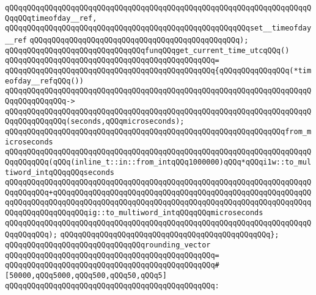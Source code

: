 \verb|qQQqqQQqqQQqqQQqqQQqqQQqqQQqqQQqqQQqqQQqqQQqqQQqqQQqqQQqqQQqqQQqqQQqqQQqqQQqtimeofday__ref,|\newline
\verb|qQQqqQQqqQQqqQQqqQQqqQQqqQQqqQQqqQQqqQQqqQQqqQQqqQQqqQQqset__timeofday__ref|\newline
\verb|qQQqqQQqqQQqqQQqqQQqqQQqqQQqqQQqqQQqqQQqqQQqqQQq);|\newline
\newline
\newline
\verb|qQQqqQQqqQQqqQQqqQQqqQQqqQQqqQQqfunqQQqget_current_time_utcqQQq()|\newline
\verb|qQQqqQQqqQQqqQQqqQQqqQQqqQQqqQQqqQQqqQQqqQQqqQQq=|\newline
\verb|qQQqqQQqqQQqqQQqqQQqqQQqqQQqqQQqqQQqqQQqqQQqqQQq{qQQqqQQqqQQqqQQq(*timeofday__refqQQq())|\newline
\verb|qQQqqQQqqQQqqQQqqQQqqQQqqQQqqQQqqQQqqQQqqQQqqQQqqQQqqQQqqQQqqQQqqQQqqQQqqQQqqQQqqQQq->|\newline
\verb|qQQqqQQqqQQqqQQqqQQqqQQqqQQqqQQqqQQqqQQqqQQqqQQqqQQqqQQqqQQqqQQqqQQqqQQqqQQqqQQqqQQq(seconds,qQQqmicroseconds);|\newline
\newline
\verb|qQQqqQQqqQQqqQQqqQQqqQQqqQQqqQQqqQQqqQQqqQQqqQQqqQQqqQQqqQQqqQQqfrom_microseconds|\newline
\verb|qQQqqQQqqQQqqQQqqQQqqQQqqQQqqQQqqQQqqQQqqQQqqQQqqQQqqQQqqQQqqQQqqQQqqQQqqQQqqQQq(qQQq(inline_t::in::from_intqQQq1000000)qQQq*qQQqi1w::to_multiword_intqQQqqQQqseconds|\newline
\verb|qQQqqQQqqQQqqQQqqQQqqQQqqQQqqQQqqQQqqQQqqQQqqQQqqQQqqQQqqQQqqQQqqQQqqQQqqQQqqQQq+qQQqqQQqqQQqqQQqqQQqqQQqqQQqqQQqqQQqqQQqqQQqqQQqqQQqqQQqqQQqqQQqqQQqqQQqqQQqqQQqqQQqqQQqqQQqqQQqqQQqqQQqqQQqqQQqqQQqqQQqqQQqqQQqqQQqqQQqqQQqqQQqqQQqig::to_multiword_intqQQqqQQqmicroseconds|\newline
\verb|qQQqqQQqqQQqqQQqqQQqqQQqqQQqqQQqqQQqqQQqqQQqqQQqqQQqqQQqqQQqqQQqqQQqqQQqqQQqqQQq);|\newline
\verb|qQQqqQQqqQQqqQQqqQQqqQQqqQQqqQQqqQQqqQQqqQQqqQQq};|\newline
\newline
\newline
\verb|qQQqqQQqqQQqqQQqqQQqqQQqqQQqqQQqrounding_vector|\newline
\verb|qQQqqQQqqQQqqQQqqQQqqQQqqQQqqQQqqQQqqQQqqQQqqQQq=|\newline
\verb|qQQqqQQqqQQqqQQqqQQqqQQqqQQqqQQqqQQqqQQqqQQqqQQq#[50000,qQQq5000,qQQq500,qQQq50,qQQq5]|\newline
\verb|qQQqqQQqqQQqqQQqqQQqqQQqqQQqqQQqqQQqqQQqqQQqqQQq:|\newline
